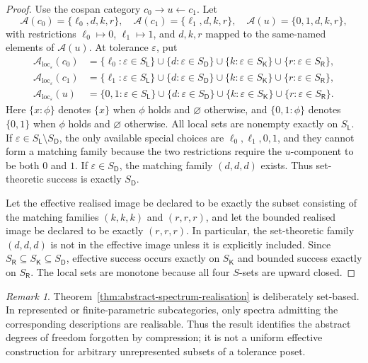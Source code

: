 \documentclass[11pt]{article}
\theoremstyle{plain}
\theoremstyle{definition}
\theoremstyle{remark}
\newtheorem{remark}[theorem]{Remark}
\newcommand{\LocalAdm}{\mathcal{A}_{\mathrm{loc}}}
\newcommand{\eps}{\varepsilon}
\begin{document}
\begin{proof}
Use the cospan category $c_0\to u\leftarrow c_1$. Let
\[
\mathcal A(c_0)=\{\ell_0,d,k,r\},\quad
\mathcal A(c_1)=\{\ell_1,d,k,r\},\quad
\mathcal A(u)=\{0,1,d,k,r\},
\]
with restrictions $\ell_0\mapsto0$, $\ell_1\mapsto1$, and $d,k,r$ mapped to the
same-named elements of $\mathcal A(u)$. At tolerance $\eps$, put
\begin{align*}
\LocalAdm_\eps(c_0)&=
\{\ell_0:\eps\in S_{\mathsf L}\}\cup
\{d:\eps\in S_{\mathsf D}\}\cup
\{k:\eps\in S_{\mathsf K}\}\cup
\{r:\eps\in S_{\mathsf R}\},\\
\LocalAdm_\eps(c_1)&=
\{\ell_1:\eps\in S_{\mathsf L}\}\cup
\{d:\eps\in S_{\mathsf D}\}\cup
\{k:\eps\in S_{\mathsf K}\}\cup
\{r:\eps\in S_{\mathsf R}\},\\
\LocalAdm_\eps(u)&=
\{0,1:\eps\in S_{\mathsf L}\}\cup
\{d:\eps\in S_{\mathsf D}\}\cup
\{k:\eps\in S_{\mathsf K}\}\cup
\{r:\eps\in S_{\mathsf R}\}.
\end{align*}
Here $\{x:\phi\}$ denotes $\{x\}$ when $\phi$ holds and $\varnothing$ otherwise,
and $\{0,1:\phi\}$ denotes $\{0,1\}$ when $\phi$ holds and $\varnothing$
otherwise. All local sets are nonempty exactly on $S_{\mathsf L}$.  If
$\eps\in S_{\mathsf L}\setminus S_{\mathsf D}$, the only available special
choices are $\ell_0,\ell_1,0,1$, and they cannot form a matching family because
the two restrictions require the $u$-component to be both $0$ and $1$. If
$\eps\in S_{\mathsf D}$, the matching family $(d,d,d)$ exists. Thus
set-theoretic success is exactly $S_{\mathsf D}$.

Let the effective realised image be declared to be exactly the subset consisting
of the matching families $(k,k,k)$ and $(r,r,r)$, and let the bounded realised
image be declared to be exactly $(r,r,r)$. In particular, the set-theoretic family
$(d,d,d)$ is not in the effective image unless it is explicitly included. Since
$S_{\mathsf R}\subseteq S_{\mathsf K}\subseteq S_{\mathsf D}$, effective success
occurs exactly on $S_{\mathsf K}$ and bounded success exactly on
$S_{\mathsf R}$. The local sets are monotone because all four $S$-sets are
upward closed.
\end{proof}

\begin{remark}
Theorem~\ref{thm:abstract-spectrum-realisation} is deliberately set-based. In
represented or finite-parametric subcategories, only spectra admitting the
corresponding descriptions are realisable. Thus the result identifies the
abstract degrees of freedom forgotten by compression; it is not a uniform
effective construction for arbitrary unrepresented subsets of a tolerance poset.
\end{remark}
\end{document}
